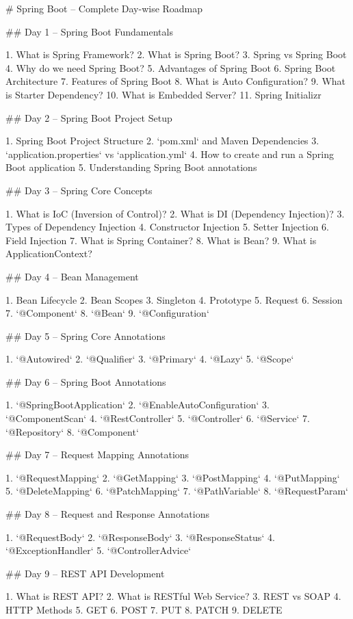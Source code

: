 

# Spring Boot – Complete Day-wise Roadmap

## Day 1 – Spring Boot Fundamentals

1. What is Spring Framework?
2. What is Spring Boot?
3. Spring vs Spring Boot
4. Why do we need Spring Boot?
5. Advantages of Spring Boot
6. Spring Boot Architecture
7. Features of Spring Boot
8. What is Auto Configuration?
9. What is Starter Dependency?
10. What is Embedded Server?
11. Spring Initializr

## Day 2 – Spring Boot Project Setup

1. Spring Boot Project Structure
2. `pom.xml` and Maven Dependencies
3. `application.properties` vs `application.yml`
4. How to create and run a Spring Boot application
5. Understanding Spring Boot annotations

## Day 3 – Spring Core Concepts

1. What is IoC (Inversion of Control)?
2. What is DI (Dependency Injection)?
3. Types of Dependency Injection
4. Constructor Injection
5. Setter Injection
6. Field Injection
7. What is Spring Container?
8. What is Bean?
9. What is ApplicationContext?

## Day 4 – Bean Management

1. Bean Lifecycle
2. Bean Scopes
3. Singleton
4. Prototype
5. Request
6. Session
7. `@Component`
8. `@Bean`
9. `@Configuration`

## Day 5 – Spring Core Annotations

1. `@Autowired`
2. `@Qualifier`
3. `@Primary`
4. `@Lazy`
5. `@Scope`

## Day 6 – Spring Boot Annotations

1. `@SpringBootApplication`
2. `@EnableAutoConfiguration`
3. `@ComponentScan`
4. `@RestController`
5. `@Controller`
6. `@Service`
7. `@Repository`
8. `@Component`

## Day 7 – Request Mapping Annotations

1. `@RequestMapping`
2. `@GetMapping`
3. `@PostMapping`
4. `@PutMapping`
5. `@DeleteMapping`
6. `@PatchMapping`
7. `@PathVariable`
8. `@RequestParam`

## Day 8 – Request and Response Annotations

1. `@RequestBody`
2. `@ResponseBody`
3. `@ResponseStatus`
4. `@ExceptionHandler`
5. `@ControllerAdvice`

## Day 9 – REST API Development

1. What is REST API?
2. What is RESTful Web Service?
3. REST vs SOAP
4. HTTP Methods
5. GET
6. POST
7. PUT
8. PATCH
9. DELETE

